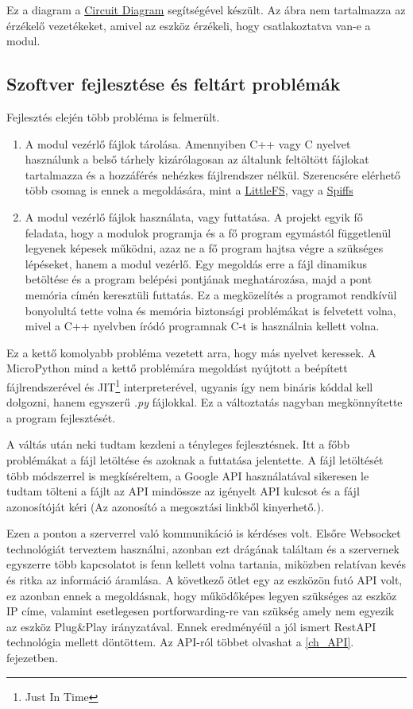 \documentclass{thesis-ekf}
\theoremstyle{definition}
\theoremstyle{remark}
\begin{document}
	Ez a diagram a \href{https://www.circuit-diagram.org/}{Circuit Diagram} segítségével készült.
	Az ábra nem tartalmazza az érzékelő vezetékeket, amivel az eszköz érzékeli, hogy csatlakoztatva van-e a modul.
	\subsection{Szoftver fejlesztése és feltárt problémák}
	\label{sub_fejlESP}
	Fejlesztés elején több probléma is felmerült.
	\begin{enumerate}
		\item A modul vezérlő fájlok tárolása. Amennyiben C++ vagy C nyelvet használunk a belső tárhely kizárólagosan az általunk feltöltött fájlokat tartalmazza és a hozzáférés nehézkes fájlrendszer nélkül. Szerencsére elérhető több csomag is ennek a megoldására, mint a \href{https://github.com/littlefs-project/littlefs}{LittleFS}, vagy a \href{https://docs.espressif.com/projects/esp-idf/en/stable/esp32/api-reference/storage/spiffs.html}{Spiffs}
		\item A modul vezérlő fájlok használata, vagy futtatása. A projekt egyik fő feladata, hogy a modulok programja és a fő program egymástól függetlenül legyenek képesek működni, azaz ne a fő program hajtsa végre a szükséges lépéseket, hanem a modul vezérlő. Egy megoldás erre a fájl dinamikus betöltése és a program belépési pontjának meghatározása, majd a pont memória címén keresztüli futtatás. Ez a megközelítés a programot rendkívül bonyolultá tette volna és memória biztonsági problémákat is felvetett volna, mivel a C++ nyelvben íródó programnak C-t is használnia kellett volna.
	\end{enumerate}
	 Ez a kettő komolyabb probléma vezetett arra, hogy más nyelvet keressek. A MicroPython mind a kettő problémára megoldást nyújtott a beépített fájlrendszerével és JIT\footnote{Just In Time} interpreterével, ugyanis így nem bináris kóddal kell dolgozni, hanem egyszerű \textit{.py} fájlokkal.
	 Ez a változtatás nagyban megkönnyítette a program fejlesztését.
	 
	 A váltás után neki tudtam kezdeni a tényleges fejlesztésnek. Itt a főbb problémákat a fájl letöltése és azoknak a futtatása jelentette. A fájl letöltését több módszerrel is megkíséreltem, a Google API használatával sikeresen le tudtam tölteni a fájlt az API mindössze az igényelt API kulcsot és a fájl azonosítóját kéri (Az azonosító a megosztási linkből kinyerhető.).
	 
	 Ezen a ponton a szerverrel való kommunikáció is kérdéses volt. Elsőre Websocket technológiát terveztem használni, azonban ezt drágának találtam és a szervernek egyszerre több kapcsolatot is fenn kellett volna tartania, miközben relatívan kevés és ritka az információ áramlása. A következő ötlet egy az eszközön futó API volt, ez azonban ennek a megoldásnak, hogy működőképes legyen szükséges az eszköz IP címe, valamint esetlegesen portforwarding-re van szükség amely nem egyezik az eszköz Plug\&Play irányzatával. Ennek eredményéül a jól ismert RestAPI technológia mellett döntöttem. Az API-ról többet olvashat a \ref{ch_API}. fejezetben.
	 
\end{document}
